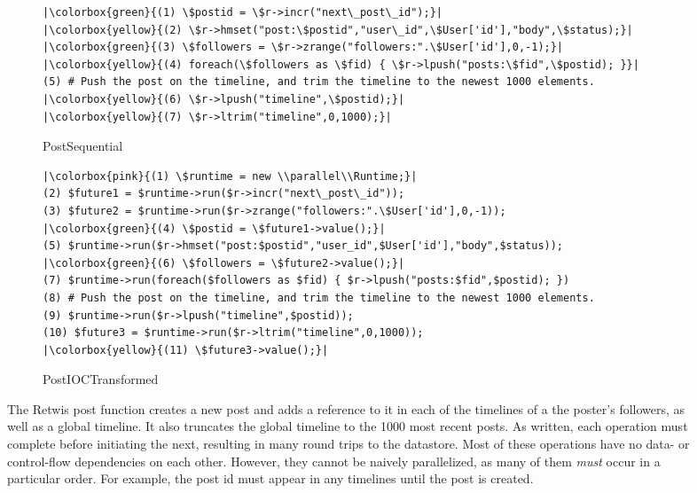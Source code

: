 \begin{figure*}[t!]
    \centering
    \begin{subfigure}[b]{\textwidth}
        \begin{verbatim}
|\colorbox{green}{(1) \$postid = \$r->incr("next\_post\_id");}|
|\colorbox{yellow}{(2) \$r->hmset("post:\$postid","user\_id",\$User['id'],"body",\$status);}|
|\colorbox{green}{(3) \$followers = \$r->zrange("followers:".\$User['id'],0,-1);}|
|\colorbox{yellow}{(4) foreach(\$followers as \$fid) { \$r->lpush("posts:\$fid",\$postid); }}|
(5) # Push the post on the timeline, and trim the timeline to the newest 1000 elements.
|\colorbox{yellow}{(6) \$r->lpush("timeline",\$postid);}|
|\colorbox{yellow}{(7) \$r->ltrim("timeline",0,1000);}|
\end{verbatim}
        \label{fig:retwissequential}
        \caption{PostSequential}
    \end{subfigure}%
    
    \begin{subfigure}[b]{\textwidth}
        \begin{verbatim}
|\colorbox{pink}{(1) \$runtime = new \\parallel\\Runtime;}|
(2) $future1 = $runtime->run($r->incr("next\_post\_id"));
(3) $future2 = $runtime->run($r->zrange("followers:".\$User['id'],0,-1));
|\colorbox{green}{(4) \$postid = \$future1->value();}|
(5) $runtime->run($r->hmset("post:$postid","user_id",$User['id'],"body",$status));
|\colorbox{green}{(6) \$followers = \$future2->value();}|
(7) $runtime->run(foreach($followers as $fid) { $r->lpush("posts:$fid",$postid); })
(8) # Push the post on the timeline, and trim the timeline to the newest 1000 elements.
(9) $runtime->run($r->lpush("timeline",$postid));
(10) $future3 = $runtime->run($r->ltrim("timeline",0,1000));
|\colorbox{yellow}{(11) \$future3->value();}|

\end{verbatim}
        \label{fig:retwistransform}
        \caption{PostIOCTransformed}
    \end{subfigure}
    \caption{The Retwis post function creates a new post and adds a reference to it in each of the timelines of a the poster's followers, as well as a global timeline. It also truncates the global timeline to the 1000 most recent posts. As written, each operation must complete before initiating the next, resulting in many round trips to the datastore. Most of these operations have no data- or control-flow dependencies on each other. However, they cannot be naively parallelized, as many of them \emph{must} occur in a particular order. For example, the post id must appear in any timelines until the post is created.}
    \label{fig:retwis-post2}
\end{figure*}

